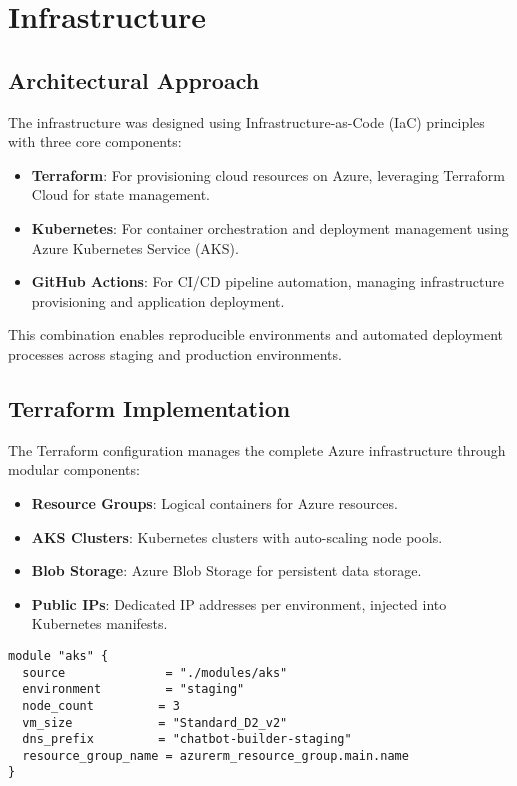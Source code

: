 \section{Infrastructure}
\label{sec:infrastructure}

\subsection{Architectural Approach}
The infrastructure was designed using Infrastructure-as-Code (IaC) principles with three core components:

\begin{itemize}
    \item \textbf{Terraform}: For provisioning cloud resources on Azure, leveraging Terraform Cloud for state management.
    \item \textbf{Kubernetes}: For container orchestration and deployment management using Azure Kubernetes Service (AKS).
    \item \textbf{GitHub Actions}: For CI/CD pipeline automation, managing infrastructure provisioning and application deployment.
\end{itemize}

This combination enables reproducible environments and automated deployment processes across staging and production environments.

\subsection{Terraform Implementation}
The Terraform configuration manages the complete Azure infrastructure through modular components:

\begin{itemize}
    \item \textbf{Resource Groups}: Logical containers for Azure resources.
    \item \textbf{AKS Clusters}: Kubernetes clusters with auto-scaling node pools.
    \item \textbf{Blob Storage}: Azure Blob Storage for persistent data storage.
    \item \textbf{Public IPs}: Dedicated IP addresses per environment, injected into Kubernetes manifests.
\end{itemize}

\begin{lstlisting}[language=HCL,caption=Sample Terraform module for AKS]
module "aks" {
  source              = "./modules/aks"
  environment         = "staging"
  node_count         = 3
  vm_size            = "Standard_D2_v2"
  dns_prefix         = "chatbot-builder-staging"
  resource_group_name = azurerm_resource_group.main.name
}
\end{lstlisting}

